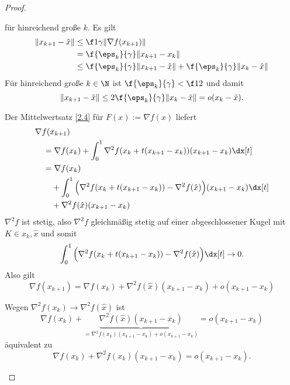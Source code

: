 \begin{st}
\begin{proof}
\begin{segnb}[„(b)$\implies$(a)“]
\[			\]
			für hinreichend große $k$.
			Es gilt
			\begin{align*}
				\|x_{k+1} - \hat x\|
				&\le \f 1\gamma \|\nabla f(x_{k+1})\| \\
				&= \f {\eps_k}{\gamma} \|x_{k+1} - x_k\| \\
				&\le \f{\eps_k}{\gamma} \|x_{k+1} - \hat x\| + \f{\eps_k}{\gamma} \|x_k - \hat x\|
			\end{align*}
			Für hinreichend große $k \in \N$ ist $\f {\eps_k}{\gamma} < \f 12$ und damit
			\[
				\|x_{k+1} - \hat x\|
				\le 2 \f {\eps_k}{\gamma} \|x_k - \hat x\|
				= o(x_k - \hat x).
			\]
		\end{segnb}
		\begin{segnb}[„(b)$\iff$(c)“]
			Der Mittelwertsatz \ref{2.4} für $F(x) := \nabla f(x)$ liefert
			\begin{align*}
				&\nabla f(x_{k+1}) \\
				&\quad= \nabla f(x_k) + \int_0^1 \nabla^2 f(x_k + t(x_{k+1} - x_k)) (x_{k+1} - x_k) \dx[t] \\
				&\quad= \nabla f(x_k) \\
					&\qquad + \int_0^1 \Big(\nabla^2 f(x_k + t(x_{k+1} - x_k)) - \nabla^2 f(\hat x) \Big) (x_{k+1} - x_k) \dx[t] \\
					&\qquad + \nabla^2 f(\hat x) (x_{k+1} - x_k)
			\end{align*}
			$\nabla^2 f$ ist stetig, also $\nabla^2 f$ gleichmäßig stetig auf einer abgeschlossener Kugel mit $K \in x_k, \hat x$ und somit
			\[
				\int_0^1 \Big( \nabla^2 f(x_k + t(x_{k+1} - x_k)) - \nabla^2 f(\hat x) \Big) \dx[t] \to 0.
			\]
			Also gilt
			\[
				\nabla f(x_{k+1})
				= \nabla f(x_k) + \nabla^2 f(\hat x) (x_{k+1} - x_k) + o(x_{k+1} - x_k)
			\]
		\end{segnb}
		\begin{segnb}[„(c)$\iff$(d)“]
			Wegen $\nabla^2 f(x_k) \to \nabla^2 f(\hat x)$ ist
			\[
				\nabla f(x_k) + \underbrace{\nabla^2 f(\hat x) (x_{k+1} - x_k)}_{=\nabla^2 f(x_k)(x_{k+1} - x_k) + o(x_{k+1} - x_k)}
				= o(x_{k+1} - x_k)
			\]
			äquivalent zu
			\[
				\nabla f(x_k) + \nabla^2 f(x_k) (x_{k+1} - x_k) = o(x_{k+1} - x_k).
			\]
		\end{segnb}
	\end{proof}
\end{st}


